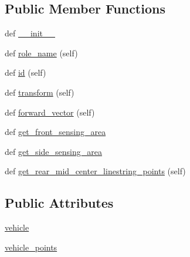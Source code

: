 \subsection*{Public Member Functions}
\begin{DoxyCompactItemize}
\item 
def \hyperlink{classimplementation_1_1actor__situation__class__detection_1_1vehicle__actor__wrapper_1_1_vehicle_actor_wrapper_ad0583b97d37e7fa415da2c4b3e316696}{\+\_\+\+\_\+init\+\_\+\+\_\+}
\item 
def \hyperlink{classimplementation_1_1actor__situation__class__detection_1_1vehicle__actor__wrapper_1_1_vehicle_actor_wrapper_af7077301cef97b0b4842c9d4c221640b}{role\+\_\+name} (self)
\item 
def \hyperlink{classimplementation_1_1actor__situation__class__detection_1_1vehicle__actor__wrapper_1_1_vehicle_actor_wrapper_a8833bbb1a122a4aba1aced7d3f7c6530}{id} (self)
\item 
def \hyperlink{classimplementation_1_1actor__situation__class__detection_1_1vehicle__actor__wrapper_1_1_vehicle_actor_wrapper_a20beab7a17865630337d1d3797552a17}{transform} (self)
\item 
def \hyperlink{classimplementation_1_1actor__situation__class__detection_1_1vehicle__actor__wrapper_1_1_vehicle_actor_wrapper_a0e913c295c7f4276b0f71144aa0c7e43}{forward\+\_\+vector} (self)
\item 
def \hyperlink{classimplementation_1_1actor__situation__class__detection_1_1vehicle__actor__wrapper_1_1_vehicle_actor_wrapper_af8f7e81209b327ea940de863ec907055}{get\+\_\+front\+\_\+sensing\+\_\+area}
\item 
def \hyperlink{classimplementation_1_1actor__situation__class__detection_1_1vehicle__actor__wrapper_1_1_vehicle_actor_wrapper_a5024be943d987313f1cf19b3b30a6eb7}{get\+\_\+side\+\_\+sensing\+\_\+area}
\item 
def \hyperlink{classimplementation_1_1actor__situation__class__detection_1_1vehicle__actor__wrapper_1_1_vehicle_actor_wrapper_ac2bc6c72668dc20542c73474d66e4e66}{get\+\_\+rear\+\_\+mid\+\_\+center\+\_\+linestring\+\_\+points} (self)
\end{DoxyCompactItemize}
\subsection*{Public Attributes}
\begin{DoxyCompactItemize}
\item 
\hyperlink{classimplementation_1_1actor__situation__class__detection_1_1vehicle__actor__wrapper_1_1_vehicle_actor_wrapper_a883123671cd96e9d6bb8072119c64608}{vehicle}
\item 
\hyperlink{classimplementation_1_1actor__situation__class__detection_1_1vehicle__actor__wrapper_1_1_vehicle_actor_wrapper_a2d5984ba61d90743c38ba6f69ebe6805}{vehicle\+\_\+points}
\end{DoxyCompactItemize}


